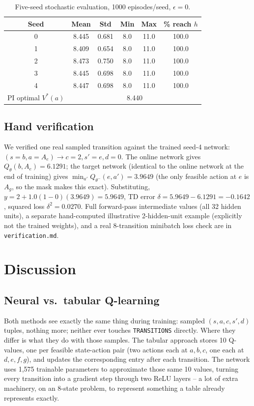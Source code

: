 \documentclass[conference]{IEEEtran}
\begin{document}
\begin{table}[t]
\centering
\caption{Five-seed stochastic evaluation, 1000 episodes/seed, $\epsilon=0$.}
\label{tab:eval}
\footnotesize
\begin{tabular}{@{}cccccc@{}}
\toprule
Seed & Mean & Std & Min & Max & \% reach $h$\\
\midrule
0 & 8.445 & 0.681 & 8.0 & 11.0 & 100.0\\
1 & 8.409 & 0.654 & 8.0 & 11.0 & 100.0\\
2 & 8.473 & 0.750 & 8.0 & 11.0 & 100.0\\
3 & 8.445 & 0.698 & 8.0 & 11.0 & 100.0\\
4 & 8.447 & 0.698 & 8.0 & 11.0 & 100.0\\
\midrule
PI optimal $V^*(a)$ & \multicolumn{5}{c}{8.440}\\
\bottomrule
\end{tabular}
\end{table}

\subsection{Hand verification}
We verified one real sampled transition against the trained seed-4
network: $(s{=}b, a{=}A_e)\to c{=}2, s'{=}e, d{=}0$. The online network
gives $Q_\theta(b,A_e){=}6.1291$; the target network (identical to the
online network at the end of training) gives
$\min_{a'}Q_{\theta^-}(e,a'){=}3.9649$ (the only feasible action at $e$ is
$A_g$, so the mask makes this exact). Substituting,
$y = 2 + 1.0(1-0)(3.9649) = 5.9649$, TD error $\delta = 5.9649 - 6.1291 =
-0.1642$, squared loss $\delta^2 = 0.0270$. Full forward-pass intermediate
values (all 32 hidden units), a separate hand-computed illustrative
2-hidden-unit example (explicitly not the trained weights), and a real
8-transition minibatch loss check are in \texttt{verification.md}.

\section{Discussion}
\subsection{Neural vs.\ tabular Q-learning}
Both methods see exactly the same thing during training: sampled
$(s,a,c,s',d)$ tuples, nothing more; neither ever touches
\texttt{TRANSITIONS} directly. Where they differ is what they do with
those samples. The tabular approach stores 10 Q-values, one per feasible
state-action pair (two actions each at $a,b,c$, one each at $d,e,f,g$),
and updates the corresponding entry after each transition. The network
uses 1,575 trainable parameters to approximate those same 10 values,
turning every transition into a gradient step through two ReLU layers --
a lot of extra machinery, on an 8-state problem, to represent something a
table already represents exactly.
\end{document}
